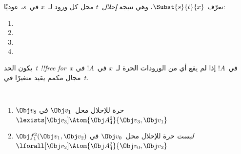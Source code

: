 \documentclass[../../../include/open-logic-section]{subfiles}
\begin{document}


\begin{defn}[الإحلال في حد]
نعرّف $\Subst{s}{t}{x}$، وهي نتيجة \emph{إحلال}~$t$ محل كل ورود
لـ~$x$ في~$s$، عوديًا:
\begin{enumerate}
\item {}

\item {}

\item {}

\item{}
\end{enumerate}
\end{defn}

\begin{defn}
يكون الحد~$t$ \emph{!!{free for}}~$x$ في~$!A$ إذا لم يقع أي من
الورودات الحرة لـ~$x$ في~$!A$ في مجال مكمم يقيد متغيرًا في~$t$.
\end{defn}

\begin{ex} ~
\begin{enumerate}
\item $\Obj v_8$ حرة للإحلال محل~$\Obj v_1$ في
  $\lexists[\Obj v_3]\Atom{\Obj A^2_4}{\Obj v_3,\Obj v_1}$

\item $\Obj f^2_1(\Obj v_1, \Obj v_2)$ \emph{ليست} حرة للإحلال
  محل~$\Obj v_0$ في
  $\lforall[\Obj v_2]\Atom{\Obj A^2_4}{\Obj v_0,\Obj v_2}$
\end{enumerate}
\end{ex}
\end{document}
